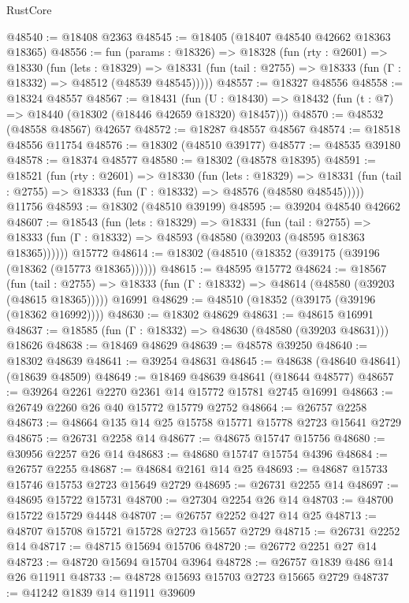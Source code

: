 \begin{lexlean}{RustCore}
\begin{coremodule}
@48540 := @18408 @2363
@48545 := @18405 (@18407 @48540 @42662 @18363 @18365)
@48556 := fun (params : @18326) =>
  @18328
    (fun (rty : @2601) =>
    @18330
      (fun (lets : @18329) =>
      @18331 (fun (tail : @2755) => @18333 (fun (Γ : @18332) => @48512 (@48539 @48545)))))
@48557 := @18327 @48556
@48558 := @18324 @48557
@48567 := @18431
    (fun (U : @18430) => @18432 (fun (t : @7) => @18440 (@18302 (@18446 @42659 @18320) @18457)))
@48570 := @48532 (@48558 @48567) @42657
@48572 := @18287 @48557 @48567
@48574 := @18518 @48556 @11754
@48576 := @18302 (@48510 @39177)
@48577 := @48535 @39180
@48578 := @18374 @48577
@48580 := @18302 (@48578 @18395)
@48591 := @18521
    (fun (rty : @2601) =>
    @18330
      (fun (lets : @18329) =>
      @18331 (fun (tail : @2755) => @18333 (fun (Γ : @18332) => @48576 (@48580 @48545)))))
    @11756
@48593 := @18302 (@48510 @39199)
@48595 := @39204 @48540 @42662
@48607 := @18543
    (fun (lets : @18329) =>
    @18331
      (fun (tail : @2755) =>
      @18333 (fun (Γ : @18332) => @48593 (@48580 (@39203 (@48595 @18363 @18365))))))
    @15772
@48614 := @18302 (@48510 (@18352 (@39175 (@39196 (@18362 (@15773 @18365))))))
@48615 := @48595 @15772
@48624 := @18567
    (fun (tail : @2755) => @18333 (fun (Γ : @18332) => @48614 (@48580 (@39203 (@48615 @18365)))))
    @16991
@48629 := @48510 (@18352 (@39175 (@39196 (@18362 @16992))))
@48630 := @18302 @48629
@48631 := @48615 @16991
@48637 := @18585 (fun (Γ : @18332) => @48630 (@48580 (@39203 @48631))) @18626
@48638 := @18469 @48629
@48639 := @48578 @39250
@48640 := @18302 @48639
@48641 := @39254 @48631
@48645 := @48638 (@48640 @48641) (@18639 @48509)
@48649 := @18469 @48639 @48641 (@18644 @48577)
@48657 := @39264 @2261 @2270 @2361 @14 @15772 @15781 @2745 @16991
@48663 := @26749 @2260 @26 @40 @15772 @15779 @2752
@48664 := @26757 @2258
@48673 := @48664 @135 @14 @25 @15758 @15771 @15778 @2723 @15641 @2729
@48675 := @26731 @2258 @14
@48677 := @48675 @15747 @15756
@48680 := @30956 @2257 @26 @14
@48683 := @48680 @15747 @15754 @4396
@48684 := @26757 @2255
@48687 := @48684 @2161 @14 @25
@48693 := @48687 @15733 @15746 @15753 @2723 @15649 @2729
@48695 := @26731 @2255 @14
@48697 := @48695 @15722 @15731
@48700 := @27304 @2254 @26 @14
@48703 := @48700 @15722 @15729 @4448
@48707 := @26757 @2252 @427 @14 @25
@48713 := @48707 @15708 @15721 @15728 @2723 @15657 @2729
@48715 := @26731 @2252 @14
@48717 := @48715 @15694 @15706
@48720 := @26772 @2251 @27 @14
@48723 := @48720 @15694 @15704 @3964
@48728 := @26757 @1839 @486 @14 @26 @11911
@48733 := @48728 @15693 @15703 @2723 @15665 @2729
@48737 := @41242 @1839 @14 @11911 @39609

\end{coremodule}
\end{lexlean}

